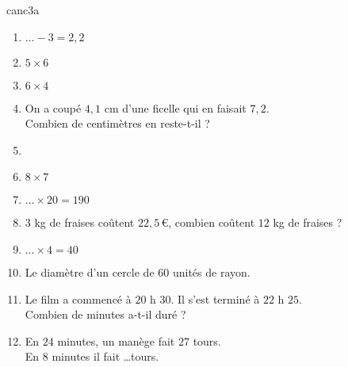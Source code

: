 \begin{EXO}{}{canc3a}
\begin{multicols}{2}
\begin{enumerate}[itemsep=1em, label=\arabic*)]
	\item {}\begin{minipage}[t]{\linewidth} $\ldots - 3=2{,}2$ \end{minipage}
	\item {}\begin{minipage}[t]{\linewidth} $5 \times 6$ \end{minipage}
	\item {}\begin{minipage}[t]{\linewidth} $6 \times 4$ \end{minipage}
	\item {}\begin{minipage}[t]{\linewidth} On a coupé $4{,}1$ cm d'une ficelle qui en faisait $7{,}2$.\\Combien de centimètres en reste-t-il ? \end{minipage}
	\item {}\begin{minipage}[t]{\linewidth} \end{minipage}
	\item {}\begin{minipage}[t]{\linewidth} $8 \times 7$ \end{minipage}

	\item {}\begin{minipage}[t]{\linewidth} $\ldots \times 20=190$ \end{minipage}
	\item {}\begin{minipage}[t]{\linewidth} $3$ kg de fraises coûtent $22{,}5$\,\euro{}, combien coûtent $12$ kg de fraises ? \end{minipage}
	\item {}\begin{minipage}[t]{\linewidth} $\ldots \times 4=40$ \end{minipage}
	\item {}\begin{minipage}[t]{\linewidth} Le diamètre d'un cercle de $60$ unités de rayon. \end{minipage}
	\item {}\begin{minipage}[t]{\linewidth} Le film a commencé à $20$ h $30$. Il s'est terminé à $22$ h $25$.\\ Combien de minutes a-t-il duré ? \end{minipage}
	\item {}\begin{minipage}[t]{\linewidth} En $24$ minutes, un manège fait $27$ tours.\\En $8$ minutes il fait \ldots tours. \end{minipage}
\end{enumerate}
\end{multicols}




\end{EXO}
